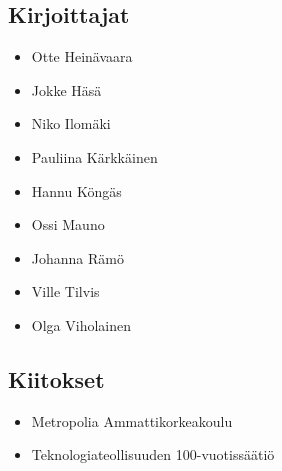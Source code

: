 \subsection*{Kirjoittajat}
\begin{itemize}
\item Otte Heinävaara
\item Jokke Häsä
\item Niko Ilomäki
\item Pauliina Kärkkäinen
\item Hannu Köngäs
\item Ossi Mauno
\item Johanna Rämö
\item Ville Tilvis
\item Olga Viholainen
\end{itemize}

\subsection*{Kiitokset}
\begin{itemize}
\item Metropolia Ammattikorkeakoulu %
\item Teknologiateollisuuden 100-vuotissäätiö %
\end{itemize}
